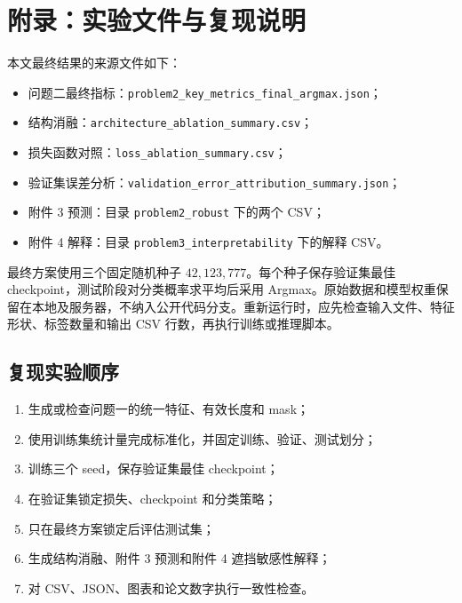 \section{附录：实验文件与复现说明}

本文最终结果的来源文件如下：
\begin{itemize}
    \item 问题二最终指标：\texttt{problem2\_key\_metrics\_final\_argmax.json}；
    \item 结构消融：\texttt{architecture\_ablation\_summary.csv}；
    \item 损失函数对照：\texttt{loss\_ablation\_summary.csv}；
    \item 验证集误差分析：\texttt{validation\_error\_attribution\_summary.json}；
    \item 附件 3 预测：目录 \texttt{problem2\_robust} 下的两个 CSV；
    \item 附件 4 解释：目录 \texttt{problem3\_interpretability} 下的解释 CSV。
\end{itemize}

最终方案使用三个固定随机种子 $42,123,777$。每个种子保存验证集最佳 checkpoint，测试阶段对分类概率求平均后采用 Argmax。原始数据和模型权重保留在本地及服务器，不纳入公开代码分支。重新运行时，应先检查输入文件、特征形状、标签数量和输出 CSV 行数，再执行训练或推理脚本。

\subsection{复现实验顺序}
\begin{enumerate}
    \item 生成或检查问题一的统一特征、有效长度和 mask；
    \item 使用训练集统计量完成标准化，并固定训练、验证、测试划分；
    \item 训练三个 seed，保存验证集最佳 checkpoint；
    \item 在验证集锁定损失、checkpoint 和分类策略；
    \item 只在最终方案锁定后评估测试集；
    \item 生成结构消融、附件 3 预测和附件 4 遮挡敏感性解释；
    \item 对 CSV、JSON、图表和论文数字执行一致性检查。
\end{enumerate}
